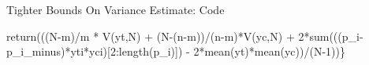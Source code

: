 \documentclass[
  11pt,
  ignorenonframetext,
]{beamer}
\newenvironment{Shaded}{\begin{snugshade}}{\end{snugshade}}
\newcommand{\DecValTok}[1]{\textcolor[rgb]{0.68,0.00,0.00}{#1}}
\newcommand{\FunctionTok}[1]{\textcolor[rgb]{0.28,0.35,0.67}{#1}}
\newcommand{\NormalTok}[1]{\textcolor[rgb]{0.00,0.23,0.31}{#1}}
\newcommand{\SpecialCharTok}[1]{\textcolor[rgb]{0.37,0.37,0.37}{#1}}
\begin{document}
\begin{frame}[fragile]{Tighter Bounds On Variance Estimate: Code}
\begin{Shaded}
\begin{Highlighting}[]
 \FunctionTok{return}\NormalTok{(((N}\SpecialCharTok{{-}}\NormalTok{m)}\SpecialCharTok{/}\NormalTok{m }\SpecialCharTok{*} \FunctionTok{V}\NormalTok{(yt,N) }\SpecialCharTok{+}\NormalTok{ (N}\SpecialCharTok{{-}}\NormalTok{(n}\SpecialCharTok{{-}}\NormalTok{m))}\SpecialCharTok{/}\NormalTok{(n}\SpecialCharTok{{-}}\NormalTok{m)}\SpecialCharTok{*}\FunctionTok{V}\NormalTok{(yc,N) }\SpecialCharTok{+}
       \DecValTok{2}\SpecialCharTok{*}\FunctionTok{sum}\NormalTok{(((p\_i}\SpecialCharTok{{-}}\NormalTok{p\_i\_minus)}\SpecialCharTok{*}\NormalTok{yti}\SpecialCharTok{*}\NormalTok{yci)[}\DecValTok{2}\SpecialCharTok{:}\FunctionTok{length}\NormalTok{(p\_i)]) }\SpecialCharTok{{-}}
       \DecValTok{2}\SpecialCharTok{*}\FunctionTok{mean}\NormalTok{(yt)}\SpecialCharTok{*}\FunctionTok{mean}\NormalTok{(yc))}\SpecialCharTok{/}\NormalTok{(N}\DecValTok{{-}1}\NormalTok{))\}}
\end{Highlighting}
\end{Shaded}
\end{frame}
\end{document}

